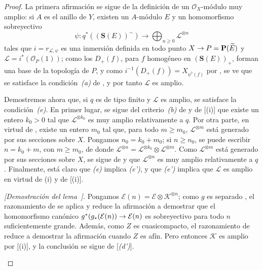 \documentclass[oneside,10pt]{amsart}
\makeatletter
\renewcommand{\geq}{\geqslant}
\newcommand{\ega@arrow}[2]{\mathchoice{#1}{#2}{#2}{#2}}
\renewcommand{\to}{\ega@arrow{\longrightarrow}{\rightarrow}}
\newcommand{\oldpage}[2][]{\marginnote{\normalfont\footnotesize\textbf{#1}~|~#2}\ignorespaces}
\let\EGAOriginalLabel\label
\renewcommand{\label}[1]{\phantomsection\EGAOriginalLabel{#1}}
\makeatother
\begin{document}
\begin{proof}
La primera afirmación se sigue de la definición  de un $\mathcal{O}_X$-módulo muy amplio:
si $A$ es el anillo de $Y$, existen un $A$-módulo $E$ y un homomorfismo sobreyectivo
\[
  \psi:q^*((\mathbf{S}(E))^{\sim})\longrightarrow
  \bigoplus_{n\geq0}\mathcal{L}^{\otimes n}
\]
tales que $i=r_{\mathcal{L},\psi}$ es una inmersión definida en todo punto $X\to P=\mathbf{P}(\widetilde{E})$ y $\mathcal{L}=i^*(\mathcal{O}_P(1))$;
como los $D_+(f)$, para $f$ homogéneo en $(\mathbf{S}(E))_+$, forman una base de la topología de $P$, y como $i^{-1}(D_+(f))=X_{\psi^\flat(f)}$ por , se ve que se satisface la condición~\emph{(a)} de , y por tanto $\mathcal{L}$ es amplio.

Demostremos ahora que, si $q$ es de tipo finito y $\mathcal{L}$ es amplio, se satisface la condición~\emph{(e)}.
En primer lugar, se sigue del criterio~\emph{(b)} de  y de [(i)] que existe
\oldpage[II]{87}
un entero $k_0>0$ tal que $\mathcal{L}^{\otimes k_0}$ es muy amplio relativamente a $q$.
Por otra parte, en virtud de , existe un entero $m_0$ tal que, para todo $m\geq m_0$, $\mathcal{L}^{\otimes m}$ está generado por sus secciones sobre $X$.
Pongamos $n_0=k_0+m_0$;
si $n\geq n_0$, se puede escribir $n=k_0+m$, con $m\geq m_0$, de donde $\mathcal{L}^{\otimes n}
=\mathcal{L}^{\otimes k_0}\otimes\mathcal{L}^{\otimes m}$.
Como $\mathcal{L}^{\otimes m}$ está generado por sus secciones sobre $X$, se sigue de  y  que $\mathcal{L}^{\otimes n}$ es muy amplio relativamente a $q$.
Finalmente, está claro que \emph{(e)} implica \emph{(e')}, y que \emph{(e')} implica que $\mathcal{L}$ es amplio en virtud de (i) y de [(i)].

  \begin{env}[4.5.10.1]
  \label{II.4.5.10.1-fr}
  \emph{[Demostración del lema~].}
  Pongamos $\mathcal{E}(n)=\mathcal{E}\otimes\mathcal{K}^{\otimes n}$;
  como $g$ es separado , el razonamiento de  se aplica y reduce la afirmación a demostrar que el homomorfismo canónico $g^*(g_*(\mathcal{E}(n))\to\mathcal{E}(n)$ es sobreyectivo para todo $n$ suficientemente grande.
  Además, como $Z$ es cuasicompacto, el razonamiento de  reduce a demostrar la afirmación cuando $Z$ es afín.
  Pero entonces $\mathcal{K}$ es amplio por [(i)], y la conclusión se sigue de [\emph{(d')}].
  \end{env}
\end{proof}
\end{document}
